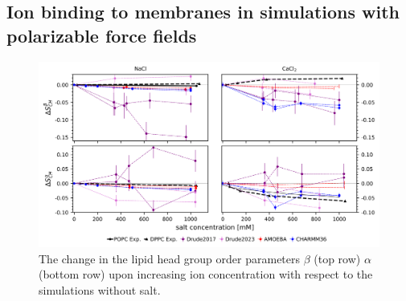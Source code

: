 \documentclass[journal=jacsat,manuscript=article,layout=singlecolumn]{achemso}
\begin{document}
\clearpage

\subsection{Ion binding to membranes in simulations with polarizable force fields}



\begin{figure}[!hbt]
	\centering
	\includegraphics{Figures/order_parameter_change.png}
	\caption{The change in the lipid head group order parameters $\beta$ (top row) $\alpha$ (bottom row) upon increasing ion concentration with respect to the simulations without salt. }
	\label{fig:popc_order_parameter_change}
\end{figure}
\end{document}
